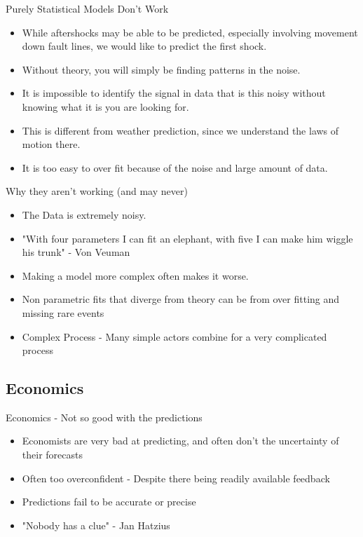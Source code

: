 \documentclass[bigger]{beamer}
\begin{document}
\begin{frame}[label=sec-3-1-2]{Purely Statistical Models Don't Work}
\begin{itemize}
\item While aftershocks may be able to be predicted, especially involving
movement down fault lines, we would like to predict the first shock.
\item Without theory, you will simply be finding patterns in the noise.
\item It is impossible to identify the signal in data that is this noisy
without knowing what it is you are looking for.
\item This is different from weather prediction, since we understand the
laws of motion there.
\item It is too easy to over fit because of the noise and large amount of data.
\end{itemize}
\end{frame}

\begin{frame}[label=sec-3-1-3]{Why they aren't working (and may never)}
\begin{itemize}
\item The Data is extremely noisy.
\item "With four parameters I can fit an elephant, with five I can make
him wiggle his trunk" - Von Veuman
\item Making a model more complex often makes it worse.
\item Non parametric fits that diverge from theory can be from over fitting
and missing rare events
\item Complex Process - Many simple actors combine for a very complicated process
\end{itemize}
\end{frame}

\subsection{Economics}
\label{sec-3-2}

\begin{frame}[label=sec-3-2-1]{Economics - Not so good with the predictions}
\begin{itemize}
\item Economists are very bad at predicting, and often don't the
uncertainty of their forecasts
\item Often too overconfident - Despite there being readily available
feedback
\item Predictions fail to be accurate or precise
\item "Nobody has a clue" - Jan Hatzius
\end{itemize}
\end{frame}
\end{document}
